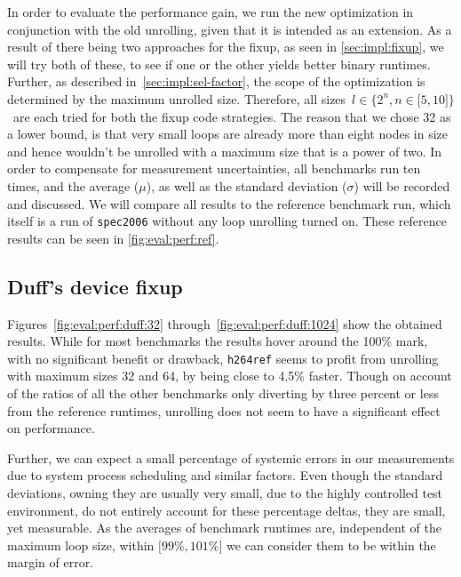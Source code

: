 In order to evaluate the performance gain, we run the new optimization in conjunction with the old unrolling, given that it is intended as an extension.
As a result of there being two approaches for the fixup, as seen in \cref{sec:impl:fixup}, we will try both of these, to see if one or the other yields better binary runtimes.
Further, as described in~\cref{sec:impl:sel-factor}, the scope of the optimization is determined by the maximum unrolled size.
Therefore, all sizes~$l \in \{2^n, n \in \lbrack 5, 10 \rbrack \}$~are each tried for both the fixup code strategies.
The reason that we chose 32 as a lower bound, is that very small loops are already more than eight nodes in size and hence wouldn't be unrolled with a maximum size that is a power of two.
In order to compensate for measurement uncertainties, all benchmarks run ten times, and the average ($\mu$), as well as the standard deviation ($\sigma$) will be recorded and discussed.
We will compare all results to the reference benchmark run, which itself is a run of \texttt{spec2006} without any loop unrolling turned on.
These reference results can be seen in \cref{fig:eval:perf:ref}.



\newpage

\subsection{Duff's device fixup}\label{sec:eval:perf:duff}

Figures~\ref{fig:eval:perf:duff:32} through~\ref{fig:eval:perf:duff:1024} show the obtained results.
While for most benchmarks the results hover around the 100\% mark, with no significant benefit or drawback, \texttt{h264ref} seems to profit from unrolling with maximum sizes 32 and 64, by being close to 4.5\% faster.
Though on account of the ratios of all the other benchmarks only diverting by three percent or less from the reference runtimes, unrolling does not seem to have a significant effect on performance.

Further, we can expect a small percentage of systemic errors in our measurements due to system process scheduling and similar factors.
Even though the standard deviations, owning they are usually very small, due to the highly controlled test environment, do not entirely account for these percentage deltas, they are small, yet measurable.
As the averages of benchmark runtimes are, independent of the maximum loop size, within $\lbrack 99\%, 101\% \rbrack$ we can consider them to be within the margin of error.

